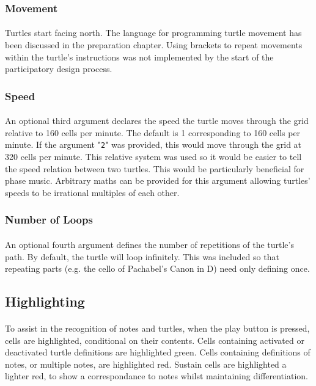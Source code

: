 \subsubsection{Movement}

\paragraph{} Turtles start facing north. The language for programming turtle movement has been discussed in the preparation chapter. Using brackets to repeat movements within the turtle's instructions was not implemented by the start of the participatory design process.

\subsubsection{Speed}

\paragraph{} An optional third argument declares the speed the turtle moves through the grid relative to 160 cells per minute. The default is 1 corresponding to 160 cells per minute. If the argument "\texttt{2}" was provided, this would move through the grid at 320 cells per minute. This relative system was used so it would be easier to tell the speed relation between two turtles. This would be particularly beneficial for phase music. Arbitrary maths can be provided for this argument allowing turtles' speeds to be irrational multiples of each other.

\subsubsection{Number of Loops}

\paragraph{} An optional fourth argument defines the number of repetitions of the turtle's path. By default, the turtle will loop infinitely. This was included so that repeating parts (e.g. the cello  of Pachabel's Canon in D) need only defining once.

\subsection{Highlighting}

\paragraph{} To assist in the recognition of notes and turtles, when the play button is pressed, cells are highlighted, conditional on their contents. Cells containing activated or deactivated turtle definitions are highlighted green. Cells containing definitions of notes, or multiple notes, are highlighted red. Sustain cells are highlighted a lighter red, to show a correspondance to notes whilst maintaining differentiation.


